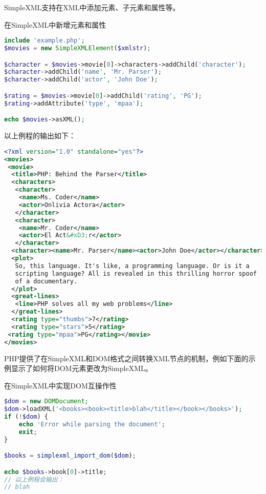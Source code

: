 SimpleXML支持在XML中添加元素、子元素和属性等。

\begin{example}
在SimpleXML中新增元素和属性
\begin{lstlisting}[language=PHP]
include 'example.php';
$movies = new SimpleXMLElement($xmlstr);

$character = $movies->movie[0]->characters->addChild('character');
$character->addChild('name', 'Mr. Parser');
$character->addChild('actor', 'John Doe');

$rating = $movies->movie[0]->addChild('rating', 'PG');
$rating->addAttribute('type', 'mpaa');

echo $movies->asXML();
\end{lstlisting}
\end{example}

以上例程的输出如下：

\begin{lstlisting}[language=XML]
<?xml version="1.0" standalone="yes"?>
<movies>
 <movie>
  <title>PHP: Behind the Parser</title>
  <characters>
   <character>
    <name>Ms. Coder</name>
    <actor>Onlivia Actora</actor>
   </character>
   <character>
    <name>Mr. Coder</name>
    <actor>El Act&#xD3;r</actor>
   </character>
  <character><name>Mr. Parser</name><actor>John Doe</actor></character></characters>
  <plot>
   So, this language. It's like, a programming language. Or is it a
   scripting language? All is revealed in this thrilling horror spoof
   of a documentary.
  </plot>
  <great-lines>
   <line>PHP solves all my web problems</line>
  </great-lines>
  <rating type="thumbs">7</rating>
  <rating type="stars">5</rating>
 <rating type="mpaa">PG</rating></movie>
</movies>
\end{lstlisting}

PHP提供了在SimpleXML和DOM格式之间转换XML节点的机制，例如下面的示例显示了如何将DOM元素更改为SimpleXML。

\begin{example}
在SimpleXML中实现DOM互操作性
\begin{lstlisting}[language=PHP]
$dom = new DOMDocument;
$dom->loadXML('<books><book><title>blah</title></book></books>');
if (!$dom) {
    echo 'Error while parsing the document';
    exit;
}

$books = simplexml_import_dom($dom);

echo $books->book[0]->title;
// 以上例程会输出：
// blah
\end{lstlisting}
\end{example}


